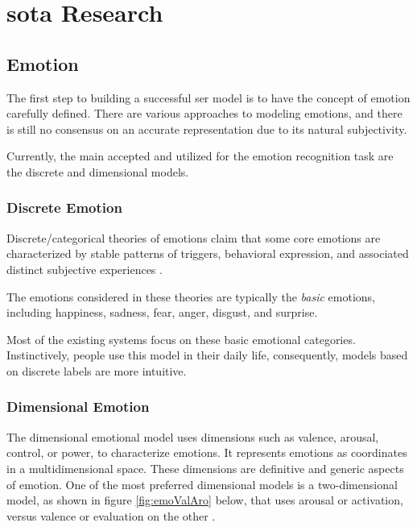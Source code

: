 \chapter{\acl{sota} Research}
\label{chapter:soa}

\section{Emotion}

The first step to building a successful \ac{ser} model is to have the concept of emotion carefully defined. There are various approaches to modeling emotions, and there is still no consensus on an accurate representation due to its natural subjectivity.

Currently, the main accepted and utilized for the emotion recognition task are the discrete and dimensional models.

\subsection{Discrete Emotion}

Discrete/categorical theories of emotions claim that some core emotions are characterized by stable patterns of triggers, behavioral expression, and associated distinct subjective experiences \cite{Hudlicka2017}.

The emotions considered in these theories are typically the \textit{basic} emotions, including happiness, sadness, fear, anger, disgust, and surprise.

Most of the existing systems focus on these basic emotional categories. Instinctively, people use this model in their daily life, consequently, models based on discrete labels are more intuitive.

\subsection{Dimensional Emotion}

The dimensional emotional model uses dimensions such as valence, arousal, control, or power, to characterize emotions. It represents emotions as coordinates in a multidimensional space. These dimensions are definitive and generic aspects of emotion. One of the most preferred dimensional models is a two-dimensional model, as shown in figure \ref{fig:emoValAro} below, that uses arousal or activation, versus valence or evaluation on the other \cite{Shuman2015}.


